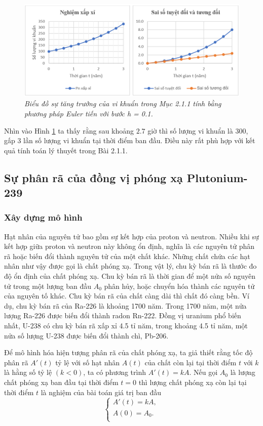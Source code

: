 \begin{figure}[!ht]
	\centering
	\includegraphics[scale=0.8]{Images/hinh_2_2.png}
	\caption[Biểu đồ sự tăng trưởng của vi khuẩn trong Mục 2.1.1 tính bằng phương pháp Euler tiến với bước h = 0.1.]{\itshape\fontsize{13pt}{0pt}\selectfont\centering Biểu đồ sự tăng trưởng của vi khuẩn trong Mục 2.1.1 tính bằng phương pháp Euler tiến với bước h = 0.1.}
	\label{hinh2.2}
\end{figure}
Nhìn vào Hình \ref{hinh2.2} ta thấy rằng sau khoảng $2.7$ giờ thì số lượng vi khuẩn là $300$, gấp $3$ lần số lượng vi khuẩn tại thời điểm ban đầu. Điều này rất phù hợp với kết quả tính toán lý thuyết trong Bài 2.1.1.
\subsection{Sự phân rã của đồng vị phóng xạ Plutonium-239}
\subsubsection{Xây dựng mô hình}
Hạt nhân của nguyên tử bao gồm sự kết hợp của proton và neutron. Nhiều khi sự kết hợp giữa proton và neutron này không ổn định, nghĩa là các nguyên tử phân rã hoặc biến đổi thành nguyên tử của một chất khác. Những chất chứa các hạt nhân như vậy được gọi là chất phóng xạ. Trong vật lý, chu kỳ bán rã là thước đo độ ổn định của chất phóng xạ. Chu kỳ bán rã là thời gian để một nửa số nguyên tử trong một lượng ban đầu $A_0$  phân hủy, hoặc chuyển hóa thành các nguyên tử của nguyên tố khác. Chu kỳ bán rã của chất càng dài thì chất đó càng bền. Ví dụ, chu kỳ bán rã của Ra-226 là khoảng 1700 năm. Trong 1700 năm, một nửa lượng Ra-226  được biến đổi thành radon Rn-222. Đồng vị uranium phổ biến nhất, U-238 có chu kỳ bán rã xấp xỉ 4.5 tỉ năm, trong khoảng 4.5 tỉ năm, một nửa số lượng U-238 được biến đổi thành chì, Pb-206.

Để mô hình hóa hiện tượng phân rã của chất phóng xạ, ta giả thiết rằng tốc độ phân rã $A'(t)$ tỷ lệ với số hạt nhân $A(t)$ của chất còn lại tại thời điểm $t$ với $k$ là hằng số tỷ lệ $(k <0)$, ta có phương trình $A'(t)=kA$. Nếu gọi $A_0$ là lượng chất phóng xạ ban đầu tại thời điểm $t=0$ thì lượng chất phóng xạ còn lại tại thời điểm $t$ là nghiệm của bài toán giá trị ban đầu 
\begin{equation}
	\left\{ \begin{array}{l}
	 A'(t)=kA, \\ 
	 A(0)={{A}_{0}}. \\ 
\end{array} \right.
\label{eq:2.2}
\end{equation}
